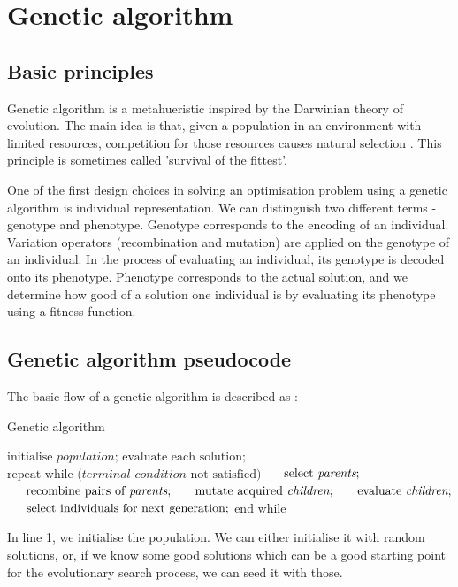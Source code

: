 \section{Genetic algorithm}
\subsection{Basic principles}
Genetic algorithm is a metahueristic inspired by the Darwinian theory of evolution. The main idea is that, given a population in an environment with limited resources, competition for those resources causes natural selection \citep{eiben2015evolutionarycomputing}.  This principle is sometimes called 'survival of the fittest'. 

One of the first design choices in solving an optimisation problem using a genetic algorithm is individual representation. We can distinguish two different terms - genotype and phenotype. Genotype corresponds to the encoding of an individual. Variation operators (recombination and mutation) are applied on the genotype of an individual. In the process of evaluating an individual, its genotype is decoded onto its phenotype. Phenotype corresponds to the actual solution, and we determine how good of a solution one individual is by evaluating its phenotype using a fitness function.

\subsection{Genetic algorithm pseudocode}
The basic flow of a genetic algorithm is described as \citep{eiben2015evolutionarycomputing}:

\begin{algorithm}[]
\caption{Genetic algorithm}
\begin{algorithmic}[1]
\State $\text{initialise } \textit{population} \text{;}$
\State $\text{evaluate } \text{each solution};$
\State $\text{repeat while (} \textit{terminal condition} \text{ not satisfied)}$
\State $\indent \text{select } \textit{parents} \text{;}$
\State $\indent \text{recombine pairs of } \textit{parents} \text{;}$
\State $\indent \text{mutate acquired } \textit{children} \text{;}$
\State $\indent \text{evaluate } \textit{children} \text{;}$
\State $\indent \text{select individuals for next generation;}$
\State $\text{end while}$
\end{algorithmic}
\end{algorithm}

In line 1, we initialise the population. We can either initialise it with random solutions, or, if we know some good solutions which can be a good starting point for the evolutionary search process, we can seed it with those.

